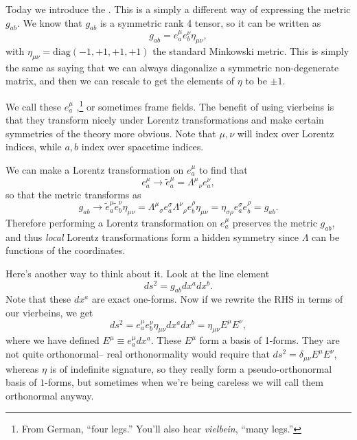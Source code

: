 Today we introduce the . This is a simply a different way of expressing the metric $g_{ab}$. We know that $g_{ab}$ is a symmetric rank 4 tensor, so it can be written as
$$g_{ab}=e_a^\mu e^\nu_b \eta_{\mu\nu},$$
with $\eta_{\mu\nu}=\text{diag}(-1,+1,+1,+1)$ the standard Minkowski metric. This is simply the same as saying that we can always diagonalize a symmetric non-degenerate matrix, and then we can rescale to get the elements of $\eta$ to be $\pm 1$.

We call these $e^\mu_a$ ,\footnote{From German, ``four legs.'' You'll also hear \emph{vielbein}, ``many legs.''} or sometimes frame fields. The benefit of using vierbeins is that they transform nicely under Lorentz transformations and make certain symmetries of the theory more obvious. Note that $\mu,\nu$ will index over Lorentz indices, while $a,b$ index over spacetime indices.

We can make a Lorentz transformation on $e_a^\mu$ to find that
$$e^\mu_a\to \tilde e^\mu_a = \Lambda^\mu{}_\nu e^\nu_a,$$
so that the metric transforms as
$$g_{ab}\to \tilde e^\mu_a \tilde e^\nu_b \eta_{\mu\nu}=\Lambda^\mu{}_\sigma e^\sigma_a \Lambda^\nu{}_\rho e^\rho_b \eta_{\mu\nu}=\eta_{\sigma\rho}e^\sigma_a e^\rho_b =g_{ab}.$$
Therefore performing a Lorentz transformation on $e^\mu_a$ preserves the metric $g_{ab}$, and thus \emph{local} Lorentz transformations form a hidden symmetry since $\Lambda$ can be functions of the coordinates.

Here's another way to think about it. Look at the line element
$$ds^2=g_{ab}dx^a dx^b.$$
Note that these $dx^a$ are exact one-forms. Now if we rewrite the RHS in terms of our vierbeins, we get
$$ds^2 = e^\mu _a e^\nu_b \eta_{\mu\nu}dx^a dx^b = \eta_{\mu\nu}E^\mu E^\nu,$$
where we have defined $E^\mu \equiv e^\mu_a dx^a$. These $E^\mu$ form a basis of 1-forms. They are not quite orthonormal-- real orthonormality would require that $ds^2=\delta_{\mu\nu}E^\mu E^\nu$, whereas $\eta$ is of indefinite signature, so they really form a  pseudo-orthonormal basis of $1$-forms, but sometimes when we're being careless we will call them orthonormal anyway.
 
